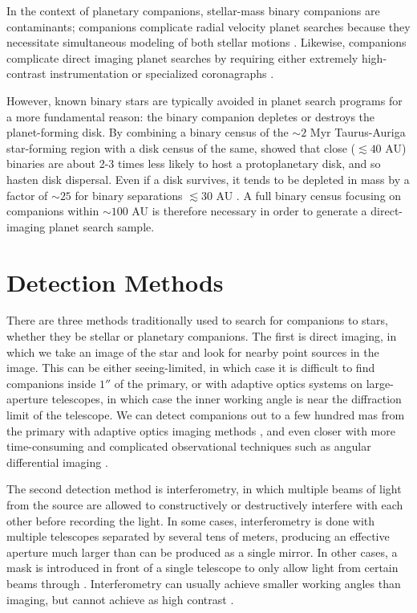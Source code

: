 \documentclass{utthesis}
\begin{document}
In the context of planetary companions, stellar-mass binary companions are contaminants; companions complicate radial velocity planet searches because they necessitate simultaneous modeling of both stellar motions \citep[e.g.][]{Bergmann2015}. Likewise, companions complicate direct imaging planet searches by requiring either extremely high-contrast instrumentation \citep{Thalmann2014} or specialized coronagraphs \citep{Crepp2010}. 

However, known binary stars are typically avoided in planet search programs for a more fundamental reason: the binary companion depletes or destroys the planet-forming disk. By combining a binary census of the $\sim 2$ Myr Taurus-Auriga star-forming region with a disk census of the same, \cite{Kraus2012} showed that close ($\lesssim 40$ AU) binaries are about 2-3 times less likely to host a protoplanetary disk, and so hasten disk dispersal. Even if a disk survives, it tends to be depleted in mass by a factor of $\sim 25$ for binary separations $\lesssim 30$ AU \citep{Harris2012}. A full binary census focusing on companions within $\sim 100$ AU is therefore necessary in order to generate a direct-imaging planet search sample.

\section{Detection Methods}

There are three methods traditionally used to search for companions to stars, whether they be stellar or planetary companions. The first is direct imaging, in which we take an image of the star and look for nearby point sources in the image. This can be either seeing-limited, in which case it is difficult to find companions inside $1''$ of the primary, or with adaptive optics systems on large-aperture telescopes, in which case the inner working angle is near the diffraction limit of the telescope. We can detect companions out to a few hundred mas from the primary with adaptive optics imaging methods \citep[see][for typical sensitivity curves of a binary survey]{DeRosa2014}, and even closer with more time-consuming and complicated observational techniques such as angular differential imaging \citep{Marois2006}. 

The second detection method is interferometry, in which multiple beams of light from the source are allowed to constructively or destructively interfere with each other before recording the light. In some cases, interferometry is done with multiple telescopes separated by several tens of meters, producing an effective aperture much larger than can be produced as a single mirror. In other cases, a mask is introduced in front of a single telescope to only allow light from certain beams through \citep[aperture masking,][]{Tuthill2000, Ireland2008}. Interferometry can usually achieve smaller working angles than imaging, but cannot achieve as high contrast \citep[see e.g.][]{Aldoretta2015}.
\end{document}
